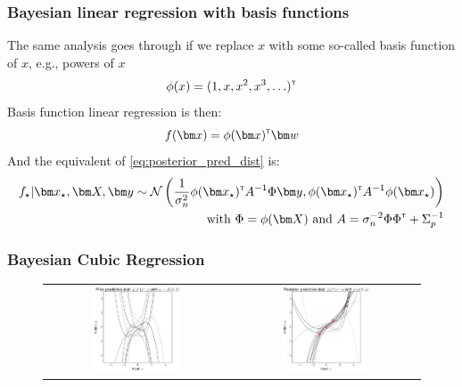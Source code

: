 \begin{frame}
\frametitle{Bayesian linear regression with basis functions}
The same analysis goes through if we replace $x$ with some so-called basis function of $x$, e.g., powers of
$x$
\begin{equation*}
\phi(x) = (1, x, x^2, x^3, \ldots)^{\textrm{\tiny{\sf{T}}}}
\end{equation*}
Basis function linear regression is then:
%
\renewcommand\theequation{2.\thedefcounter}
\setcounter{defcounter}{10}
\begin{equation}
f(\bx) = \phi(\bx)\transpose \bw
\end{equation}
%
And the equivalent of \ref{eq:posterior_pred_dist} is:
%
\renewcommand\theequation{2.\thedefcounter}
\setcounter{defcounter}{11}
\begin{align} \label{eq:posterior_pred_dist_basis}
f_{\star} | \bx_{\star}, \bX, \by \sim \norm \left( \frac{1}{\sigma_n^2} \phi(\bx_{\star})\transpose A\inv \Phi \by,
                                                    \phi(\bx_{\star})\transpose A\inv \phi(\bx_{\star}) \right) \\
\nonumber{} \text{with } \Phi = \phi(\bX) \text{ and } A = \sigma_n^{-2} \Phi \Phi\transpose + \Sigma_p\inv
\end{align}
%
\end{frame}


\begin{frame}
\frametitle{Bayesian Cubic Regression}
\begin{figure}
\centering
    \begin{tabular}{cc}
        \includegraphics[width=0.5\textwidth]{images/plots/feat_space_prior.pdf} &
        \includegraphics[width=0.5\textwidth]{images/plots/feat_space_posterior.pdf} 
    \end{tabular}
\end{figure}
\end{frame}

